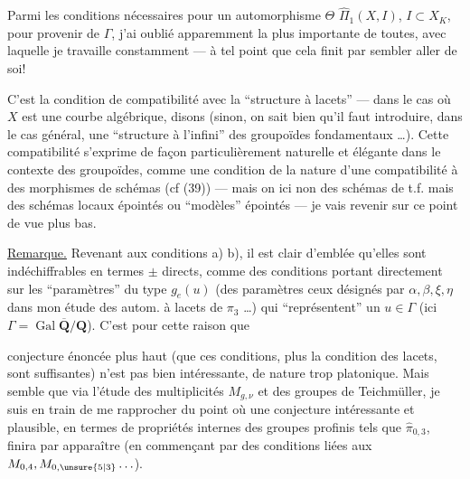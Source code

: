 Parmi les conditions nécessaires  pour un automorphisme $\Theta$  $\widehat{\Pi}_1(X,I)$, $I\subset X_K$, pour provenir de $\Gamma$, j'ai oublié apparemment la plus importante de toutes, avec laquelle je travaille  constamment --- à tel point que cela finit par sembler aller de soi!

C'est la condition de compatibilité avec la ``structure à lacets'' --- dans le cas où $X$ est une courbe algébrique, disons (sinon, on sait bien qu'il faut introduire, dans le cas général, une ``structure à l'infini'' des groupoïdes fondamentaux \ldots). \margin{$\Vert$} Cette compatibilité  s'exprime de façon particulièrement naturelle et élégante dans le contexte des groupoïdes, \unsure{$\{$} comme une condition de la nature d'une compatibilité à des morphismes de schémas (cf (39)) --- mais on  ici non des schémas de t.f. mais des schémas locaux épointés ou ``modèles'' épointés --- je vais revenir sur ce point de vue plus bas.

\uline{Remarque.} Revenant aux conditions a) b), il est clair d'emblée qu'elles sont indéchiffrables  en termes $\pm$ directs, comme des conditions portant directement sur les ``paramètres'' du type $g_e(u)$ (des paramètres   ceux désignés par $\alpha,\beta,\xi,\eta$ dans mon étude des autom. à lacets de $\pi_3$ \ldots) qui ``représentent'' un $u\in\Gamma$ (ici $\Gamma=\operatorname{Gal}\overline{\mathbf{Q}}/\mathbf{Q}$).  C'est pour cette raison que 

conjecture énoncée plus haut (que ces conditions, plus la condition des lacets,  sont suffisantes) n'est pas bien intéressante, de nature trop platonique. Mais    semble que via l'étude des multiplicités  $M_{g,\nu}$ et des groupes de Teichmüller, je suis en train de me rapprocher du point où une conjecture intéressante et plausible, en termes de propriétés internes des groupes profinis tels que $\widehat{\pi}_{0,3}$, finira par apparaître (en commençant par des conditions liées aux $M_{0,4},M_{0,\unsure{5|3}}\ldots$).

